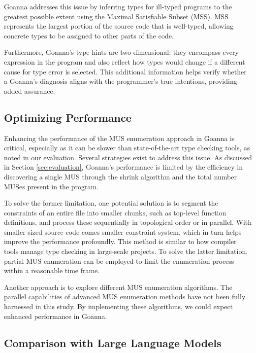 \documentclass[pdflatex,sn-mathphys-num]{sn-jnl}%
\begin{document}
Goanna addresses this issue by inferring types for ill-typed programs to the greatest possible extent using the Maximal Satisfiable Subset (MSS). MSS represents the largest portion of the source code that is well-typed, allowing concrete types to be assigned to other parts of the code.

Furthermore, Goanna's type hints are two-dimensional: they encompass every expression in the program and also reflect how types would change if a different cause for type error is selected. This additional information helps verify whether a Goanna's diagnosis aligns with the programmer's true intentions, providing added assurance.

\subsection{Optimizing Performance}

Enhancing the performance of the MUS enumeration approach in Goanna is critical, especially as it can be slower than state-of-the-art type checking tools, as noted in our evaluation. Several strategies exist to address this issue. As discussed in Section \ref{sec:evaluation}, Goanna's performance is limited by the efficiency in discovering a single MUS through the shrink algorithm and the total number MUSes present in the program.

To solve the former limitation, one potential solution is to segment the constraints of an entire file into smaller chunks, such as top-level function definitions, and process these sequentially in topological order or in parallel. With smaller sized source code comes smaller constraint system, which in turn helps improve the performance profoundly. This method is similar to how compiler tools manage type checking in large-scale projects. To solve the latter limitation,  partial MUS enumeration \cite{Previti2013-mr, Liffiton2016-xi} can be employed to limit the enumeration process within a reasonable time frame.

Another approach is to explore different MUS enumeration algorithms. The parallel capabilities of advanced MUS enumeration methods \cite{Zhao2016-bu, Bendik2020-pz} have not been fully harnessed in this study. By implementing these algorithms, we could expect enhanced performance in Goanna.



\subsection{Comparison with Large Language Models}
    
\end{document}
